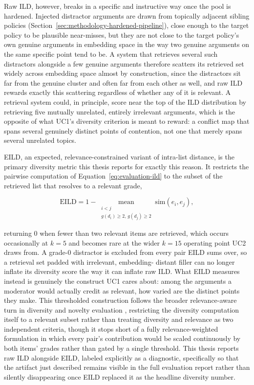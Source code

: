 Raw ILD, however, breaks in a specific and instructive way once the pool is hardened. Injected
distractor arguments are drawn from topically adjacent sibling policies
(Section~\ref{sec:methodology-hardened-pipeline}), close enough to the target policy to be
plausible near-misses, but they are not close to the target policy's own genuine arguments in
embedding space in the way two genuine arguments on the same specific point tend to be. A system
that retrieves several such distractors alongside a few genuine arguments therefore scatters its
retrieved set widely across embedding space almost by construction, since the distractors sit far
from the genuine cluster and often far from each other as well, and raw ILD rewards exactly this
scattering regardless of whether any of it is relevant. A retrieval system could, in principle,
score near the top of the ILD distribution by retrieving five mutually unrelated, entirely
irrelevant arguments, which is the opposite of what UC1's diversity criterion is meant to reward: a
conflict map that spans several genuinely distinct points of contention, not one that merely spans
several unrelated topics.

EILD, an expected, relevance-constrained variant of intra-list distance, is the primary diversity
metric this thesis reports for exactly this reason. It restricts the pairwise computation of
Equation~\ref{eq:evaluation-ild} to the subset of the retrieved list that resolves to a relevant
grade,

\begin{equation}
\mathrm{EILD} = 1 - \operatorname*{mean}_{\substack{i<j \\ g(d_i) \geq 2,\, g(d_j) \geq 2}}
\mathrm{sim}(e_i, e_j),
\label{eq:evaluation-eild}
\end{equation}

\noindent returning 0 when fewer than two relevant items are retrieved, which occurs occasionally
at $k=5$ and becomes rare at the wider $k=15$ operating point UC2 draws from. A grade-0 distractor
is excluded from every pair EILD sums over, so a retrieval set padded with irrelevant, embedding-
distant filler can no longer inflate its diversity score the way it can inflate raw ILD. What EILD
measures instead is genuinely the construct UC1 cares about: among the arguments a moderator would
actually credit as relevant, how varied are the distinct points they make. This thresholded
construction follows the broader relevance-aware turn in diversity and novelty evaluation
\cite{ziegler2005diversification,clarke2008novelty}, restricting the diversity computation itself to
a relevant subset rather than treating diversity and relevance as two independent criteria, though
it stops short of a fully relevance-weighted formulation in which every pair's contribution would be
scaled continuously by both items' grades rather than gated by a single threshold. This thesis
reports raw ILD alongside EILD, labeled explicitly as a diagnostic, specifically so that the
artifact just described remains visible in the full evaluation report rather than silently
disappearing once EILD replaced it as the headline diversity number.

